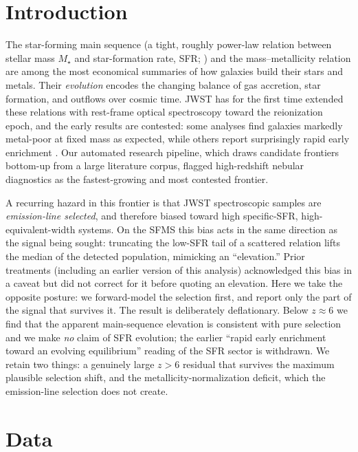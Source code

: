 \documentclass[twocolumn]{aastex631}
\begin{document}
\section{Introduction}
The star-forming main sequence (a tight, roughly power-law relation between stellar mass $M_\star$ and star-formation rate, SFR; \citealt{noeske07,speagle14}) and the mass--metallicity relation \citep{tremonti04,kewley08} are among the most economical summaries of how galaxies build their stars and metals. Their \emph{evolution} encodes the changing balance of gas accretion, star formation, and outflows over cosmic time. JWST has for the first time extended these relations with rest-frame optical spectroscopy toward the reionization epoch, and the early results are contested: some analyses find galaxies markedly metal-poor at fixed mass as expected, while others report surprisingly rapid early enrichment \citep{nakajima23,curti24,sanders21}. Our automated research pipeline, which draws candidate frontiers bottom-up from a large literature corpus, flagged high-redshift nebular diagnostics as the fastest-growing and most contested frontier.

A recurring hazard in this frontier is that JWST spectroscopic samples are \emph{emission-line selected}, and therefore biased toward high specific-SFR, high-equivalent-width systems. On the SFMS this bias acts in the same direction as the signal being sought: truncating the low-SFR tail of a scattered relation lifts the median of the detected population, mimicking an ``elevation.'' Prior treatments (including an earlier version of this analysis) acknowledged this bias in a caveat but did not correct for it before quoting an elevation. Here we take the opposite posture: we forward-model the selection first, and report only the part of the signal that survives it. The result is deliberately deflationary. Below $z\approx6$ we find that the apparent main-sequence elevation is consistent with pure selection and we make \emph{no} claim of SFR evolution; the earlier ``rapid early enrichment toward an evolving equilibrium'' reading of the SFR sector is withdrawn. We retain two things: a genuinely large $z>6$ residual that survives the maximum plausible selection shift, and the metallicity-normalization deficit, which the emission-line selection does not create.

\section{Data}
\end{document}
